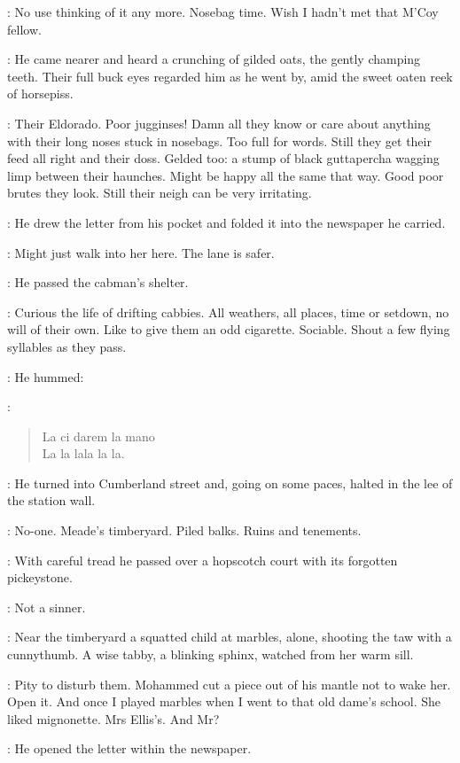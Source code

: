 \BloomInt:
No use thinking of it any more.
Nosebag time.
Wish I hadn't met that M'Coy fellow.

:
He came nearer and heard a crunching of gilded oats,
the gently champing teeth.
Their full buck eyes regarded him as he went by,
amid the sweet oaten reek of horsepiss.

\BloomInt:
Their Eldorado.
Poor jugginses!
Damn all they know or care about anything
with their long noses stuck in nosebags.
Too full for words.
Still they get their feed all right and their doss.
Gelded too:
a stump of black guttapercha wagging limp between their haunches.
Might be happy all the same that way.
Good poor brutes they look.
Still their neigh can be very irritating.

:
He drew the letter from his pocket
and folded it into the newspaper he carried.

\BloomInt:
Might just walk into her here.
The lane is safer.

:
He passed the cabman's shelter.

\BloomInt:
Curious the life of drifting cabbies.
All weathers, all places,
time or setdown,
no will of their own.
Like to give them an odd cigarette.
Sociable.
Shout a few flying syllables as they pass.

:
He hummed:

\BloomInt:
\begin{verse}
    La ci darem la mano \\
    La la lala la la.
\end{verse}

:
He turned into Cumberland street
and, going on some paces,
halted in the lee of the station wall.

\BloomInt:
No-one.
Meade's timberyard.
Piled balks.
Ruins and tenements.

:
With careful tread
he passed over a hopscotch court with its forgotten pickeystone.

\BloomInt:
Not a sinner.

:
Near the timberyard a squatted child at marbles,
alone,
shooting the taw with a cunnythumb.
A wise tabby, a blinking sphinx,
watched from her warm sill.

\BloomInt:
Pity to disturb them.
Mohammed cut a piece out of his mantle not to wake her.
Open it.
And once I played marbles when I went to that old dame's school.
She liked mignonette.
Mrs Ellis's.
And Mr?

:
He opened the letter within the newspaper.

